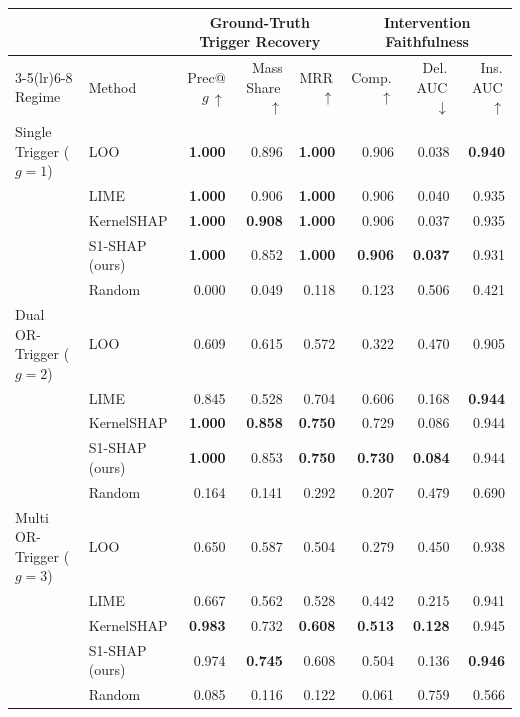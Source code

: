 \begin{tabular}{llrrrrrr}
\toprule
 & & \multicolumn{3}{c}{Ground-Truth Trigger Recovery} & \multicolumn{3}{c}{Intervention Faithfulness} \\
\cmidrule(lr){3-5}\cmidrule(lr){6-8}
Regime & Method & Prec@$g\,\uparrow$ & Mass Share\,$\uparrow$ & MRR\,$\uparrow$ & Comp.\,$\uparrow$ & Del.\,AUC\,$\downarrow$ & Ins.\,AUC\,$\uparrow$ \\
\midrule
Single Trigger ($g{=}1$) & LOO & \textbf{1.000} & 0.896 & \textbf{1.000} & 0.906 & 0.038 & \textbf{0.940} \\
 & LIME & \textbf{1.000} & 0.906 & \textbf{1.000} & 0.906 & 0.040 & 0.935 \\
 & KernelSHAP & \textbf{1.000} & \textbf{0.908} & \textbf{1.000} & 0.906 & 0.037 & 0.935 \\
 & S1-SHAP (ours) & \textbf{1.000} & 0.852 & \textbf{1.000} & \textbf{0.906} & \textbf{0.037} & 0.931 \\
 & Random & 0.000 & 0.049 & 0.118 & 0.123 & 0.506 & 0.421 \\
\midrule
Dual OR-Trigger ($g{=}2$) & LOO & 0.609 & 0.615 & 0.572 & 0.322 & 0.470 & 0.905 \\
 & LIME & 0.845 & 0.528 & 0.704 & 0.606 & 0.168 & \textbf{0.944} \\
 & KernelSHAP & \textbf{1.000} & \textbf{0.858} & \textbf{0.750} & 0.729 & 0.086 & 0.944 \\
 & S1-SHAP (ours) & \textbf{1.000} & 0.853 & \textbf{0.750} & \textbf{0.730} & \textbf{0.084} & 0.944 \\
 & Random & 0.164 & 0.141 & 0.292 & 0.207 & 0.479 & 0.690 \\
\midrule
Multi OR-Trigger ($g{=}3$) & LOO & 0.650 & 0.587 & 0.504 & 0.279 & 0.450 & 0.938 \\
 & LIME & 0.667 & 0.562 & 0.528 & 0.442 & 0.215 & 0.941 \\
 & KernelSHAP & \textbf{0.983} & 0.732 & \textbf{0.608} & \textbf{0.513} & \textbf{0.128} & 0.945 \\
 & S1-SHAP (ours) & 0.974 & \textbf{0.745} & 0.608 & 0.504 & 0.136 & \textbf{0.946} \\
 & Random & 0.085 & 0.116 & 0.122 & 0.061 & 0.759 & 0.566 \\
\bottomrule
\end{tabular}
